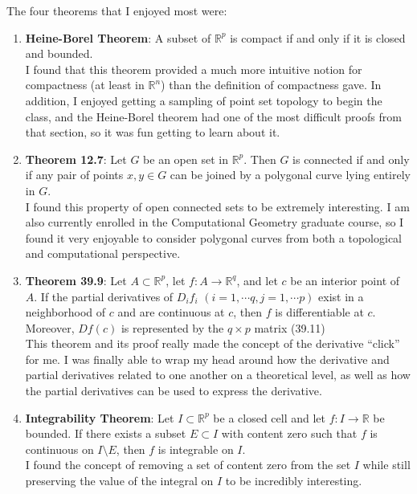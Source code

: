 \documentclass[12pt]{article}
\newenvironment{problem}[2][Problem]{\begin{trivlist}
\item[\hskip \labelsep {\bfseries #1}\hskip \labelsep {\bfseries #2.}]}{\end{trivlist}}
\begin{document}
\begin{problem}{4}
\end{problem}

The four theorems that I enjoyed most were:
\begin{enumerate}
\item \textbf{Heine-Borel Theorem}: A subset of $\mathbb{R}^p$ is compact if and only if it is closed and bounded.\\

I found that this theorem provided a much more intuitive notion for compactness (at least in $\mathbb{R}^n$) than the definition of compactness gave. In addition, I enjoyed getting a sampling of point set topology to begin the class, and the Heine-Borel theorem had one of the most difficult proofs from that section, so it was fun getting to learn about it.

\item \textbf{Theorem 12.7}: Let $G$ be an open set in $\mathbb{R}^p$. Then $G$ is connected if and only if any pair of points $x, y \in G$ can be joined by a polygonal curve lying entirely in $G$.\\

I found this property of open connected sets to be extremely interesting. I am also currently enrolled in the Computational Geometry graduate course, so I found it very enjoyable to consider polygonal curves from both a topological and computational perspective.
\item \textbf{Theorem 39.9}: Let $A \subset \mathbb{R}^p$, let $f: A \to \mathbb{R}^q$, and let $c$ be an interior point of $A$. If the partial derivatives of $D_if_i$ $(i = 1, \cdots q, j = 1, \cdots p)$ exist in a neighborhood of $c$ and are continuous at $c$, then $f$ is differentiable at $c$. Moreover, $Df(c)$ is represented by the $q \times p$ matrix (39.11)\\

This theorem and its proof really made the concept of the derivative ``click'' for me. I was finally able to wrap my head around how the derivative and partial derivatives related to one another on a theoretical level, as well as how the partial derivatives can be used to express the derivative.

\item \textbf{Integrability Theorem}: Let $I \subset \mathbb{R}^p$ be a closed cell and let $f: I \to \mathbb{R}$ be bounded. If there exists a subset $E \subset I$ with content zero such that $f$ is continuous on $I \setminus E$, then $f$ is integrable on $I$.\\

I found the concept of removing a set of content zero from the set $I$ while still preserving the value of the integral on $I$ to be incredibly interesting.
\end{enumerate}
\end{document}
